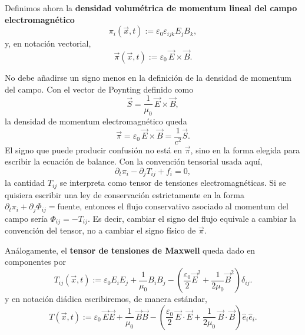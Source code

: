 \documentclass[12pt,a4paper]{article}
\theoremstyle{definition}
\theoremstyle{plain}
\numberwithin{equation}{section}
\theoremstyle{remark}
\newcommand{\E}{\vec{E}}
\newcommand{\B}{\vec{B}}
\begin{document}
Definimos ahora la \textbf{densidad volumétrica de momentum lineal del campo electromagnético}
\begin{equation}
    \pi_i(\vec x,t):=\varepsilon_0\varepsilon_{ijk}E_jB_k,
    \label{eq:momentum-density-indicial}
\end{equation}
y, en notación vectorial,
\begin{equation}
    \vec\pi(\vec x,t):=\varepsilon_0\,\E\times\B.
    \label{eq:momentum-density-diadic}
\end{equation}
\begin{cuidado}
No debe añadirse un signo menos en la definición de la densidad de momentum del campo. Con el vector de Poynting definido como
\begin{equation*}
    \vec S=\frac{1}{\mu_0}\,\E\times\B,
\end{equation*}
la densidad de momentum electromagnético queda
\begin{equation*}
    \vec\pi=\varepsilon_0\,\E\times\B=\frac{1}{c^2}\vec S.
\end{equation*}
El signo que puede producir confusión no está en $\vec\pi$, sino en la forma elegida para escribir la ecuación de balance. Con la convención tensorial usada aquí,
\begin{equation*}
    \partial_t\pi_i-\partial_jT_{ij}+f_i=0,
\end{equation*}
la cantidad $T_{ij}$ se interpreta como tensor de tensiones electromagnéticas. Si se quisiera escribir una ley de conservación estrictamente en la forma $\partial_t\pi_i+\partial_j\Phi_{ij}=\text{fuente}$, entonces el flujo conservativo asociado al momentum del campo sería $\Phi_{ij}=-T_{ij}$. Es decir, cambiar el signo del flujo equivale a cambiar la convención del tensor, no a cambiar el signo físico de $\vec\pi$.
\end{cuidado}
Análogamente, el \textbf{tensor de tensiones de Maxwell} queda dado en componentes por
\begin{equation}
    T_{ij}(\vec x,t)
    :=
    \varepsilon_0E_iE_j
    +
    \frac{1}{\mu_0}B_iB_j
    -
    \left(
        \frac{\varepsilon_0}{2}\E^2
        +
        \frac{1}{2\mu_0}\B^2
    \right)\delta_{ij}.
    \label{eq:maxwell-stress-tensor}
\end{equation}
y en notación diádica escribiremos, de manera estándar,
\begin{equation}
    T(\vec x,t)
    :=
    \varepsilon_0\,\E\E
    +
    \frac{1}{\mu_0}\,\B\B
    -
    \left(
        \frac{\varepsilon_0}{2}\,\E\cdot\E
        +
        \frac{1}{2\mu_0}\,\B\cdot\B
    \right)\hat e_i\hat e_i.
    \label{eq:maxwell-stress-tensor-diadic}
\end{equation}
\end{document}
